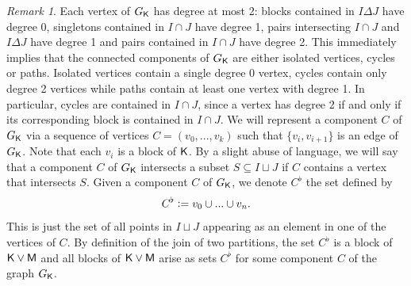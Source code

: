 \documentclass[11pt, a4paper, oneside, reqno]{amsart}
\newcommand{\sK}{{\sf K}}
\newcommand{\sM}{{\sf M}}
\theoremstyle{remark}
\newtheorem{remark}[theorem]{Remark}
\theoremstyle{definition}
\numberwithin{equation}{section}
\begin{document}
\newcommand{\graphK}{{G_{\sf K}}}
\begin{remark}\label{rmk:graphKremarks}
	Each vertex of $\graphK$ has degree at most 2: blocks contained in $I \Delta J$ have degree 0, singletons contained in $I \cap J$ have degree 1, pairs intersecting $I\cap J$ and $I \Delta J$ have degree 1 and pairs contained in $I \cap J$ have degree 2. This immediately implies that the connected components of $\graphK$ are either isolated vertices, cycles or paths. Isolated vertices contain a single degree 0 vertex, cycles  contain only degree 2 vertices while paths contain at least one vertex with degree 1. In particular, cycles are contained in $I \cap J$, since a vertex has degree 2 if and only if its corresponding block is contained in $I \cap J$. We will represent a component $C$ of $\graphK$ via a sequence of vertices $C = (v_0,...,v_k)$ such that $\{v_i,v_{i+1}\}$ is an edge of $\graphK$. Note that each $v_i$ is a block of $\sK$. By a slight abuse of language, we will say that a component $C$ of $\graphK$ intersects a subset $S \subseteq I \sqcup J$ if $C$ contains a vertex that intersects $S$. Given a component $C$ of $\graphK$, we  denote $C^\flat$ the set defined by
	$$
		C^\flat \vcentcolon= v_0 \cup...\cup v_n.
	$$
	This is just the set of all points in $I \sqcup J$ appearing as an  element in one of the vertices of $C$. By definition of the join of two partitions, the set $C^\flat$ is a block of $\sK \vee \sM$ and all blocks of $\sK \vee \sM$ arise as sets $C^\flat$ for some component $C$ of the graph $\graphK$.

\end{remark}
\end{document}
